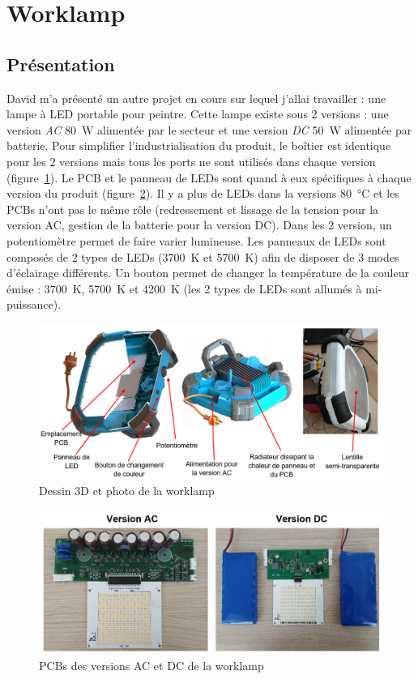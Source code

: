 \documentclass[a4paper, 12pt, sffamily]{report}
\begin{document}
\section{Worklamp}
\subsection{Présentation}
David m’a présenté un autre projet en cours sur lequel j'allai travailler : une lampe à LED portable pour peintre. Cette lampe existe sous 2 versions : une version \emph{AC} \SI{80}{\watt} alimentée par le secteur et une version \emph{DC} \SI{50}{\watt} alimentée par batterie. Pour simplifier l'industrialisation du produit, le boîtier est identique pour les 2 versions mais tous les ports ne sont utilisés dans chaque version (figure~\ref{fig:captioned_worklamp}). Le PCB et le panneau de LEDs sont quand à eux spécifiques à chaque version du produit (figure~\ref{fig:worklamp_PCBs}). Il y a plus de LEDs dans la versions \SI{80}{\celsius} et les PCBs n'ont pas le même rôle (redressement et lissage de la tension pour la version AC, gestion de la batterie pour la version DC).
Dans les 2 version, un potentiomètre permet de faire varier lumineuse. Les panneaux de LEDs sont composés de 2 types de LEDs (\SI{3700}{\kelvin} et \SI{5700}{\kelvin}) afin de disposer de 3 modes d’éclairage différents. Un bouton permet de changer la température de la couleur émise : \SI{3700}{\kelvin}, \SI{5700}{\kelvin} et \SI{4200}{\kelvin} (les 2 types de LEDs sont allumés à mi-puissance). 

\begin{figure}[H]
\centering
\includegraphics[scale=0.45]{figures/screenshots/captioned_worklamp.png}
\caption{Dessin 3D et photo de la worklamp}
\label{fig:captioned_worklamp}
\end{figure}

\begin{figure}[H]
\centering
\includegraphics[scale=0.43]{figures/photos/worklamp_PCBs.jpg}
\caption{PCBs des versions AC et DC de la worklamp}
\label{fig:worklamp_PCBs}
\end{figure}
\end{document}
